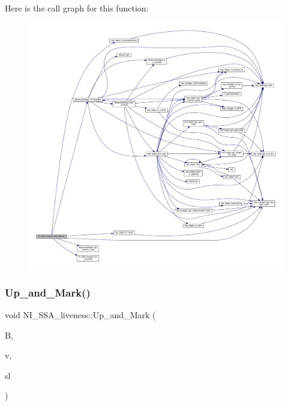 Here is the call graph for this function\+:
\nopagebreak
\begin{figure}[H]
\begin{center}
\leavevmode
\includegraphics[width=350pt]{d6/db7/classNI__SSA__liveness_aecf212baba3490d67930ead02c27dfc7_cgraph}
\end{center}
\end{figure}
\mbox{\label{classNI__SSA__liveness_a4d59889b909cf697aafcfa562e93ecf8}} 
\subsubsection{\texorpdfstring{Up\+\_\+and\+\_\+\+Mark()}{Up\_and\_Mark()}}
{\footnotesize\ttfamily void N\+I\+\_\+\+S\+S\+A\+\_\+liveness\+::\+Up\+\_\+and\+\_\+\+Mark (\begin{DoxyParamCaption}\item[{bloc\+Ref}]{B,  }\item[{\hyperlink{tree__node_8hpp_a6ee377554d1c4871ad66a337eaa67fd5}{tree\+\_\+node\+Ref}}]{v,  }\item[{\hyperlink{structstatement__list}{statement\+\_\+list} $\ast$}]{sl }\end{DoxyParamCaption})\hspace{0.3cm}{\ttfamily [private]}}



